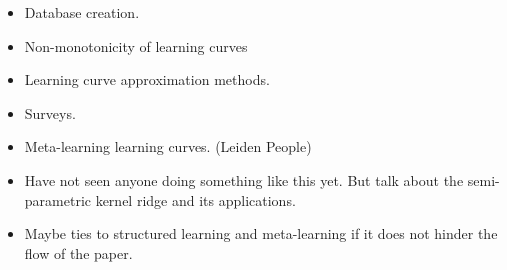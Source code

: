 \begin{itemize}
  \item Database creation.
  \item Non-monotonicity of learning curves
  \item Learning curve approximation methods.
  \item Surveys.
  \item Meta-learning learning curves. (Leiden People)
  \item Have not seen anyone doing something like this yet. But talk about the semi-parametric kernel ridge and its applications.
  \item Maybe ties to structured learning and meta-learning if it does not hinder the flow of the paper.
\end{itemize}
